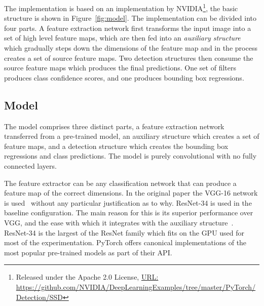 The implementation is based on an implementation by NVIDIA\footnote{Released under the Apache 2.0 License, \href{https://github.com/NVIDIA/DeepLearningExamples/tree/master/PyTorch/Detection/SSD}{URL:\\ } \url{https://github.com/NVIDIA/DeepLearningExamples/tree/master/PyTorch/Detection/SSD}}, the basic structure is shown in Figure~\ref{fig:model}.
The implementation can be divided into four parts.
A feature extraction network first transforms the input image into a set of high level feature maps, which are then fed into an \textit{auxiliary structure} which gradually steps down the dimensions of the feature map and in the process creates a set of source feature maps.
Two detection structures then consume the source feature maps which produces the final predictions.
One set of filters produces class confidence scores, and one produces bounding box regressions.

\subsection{Model}
The model comprises three distinct parts, a feature extraction network transferred from a pre-trained model, an auxiliary structure which creates a set of feature maps, and a detection structure which creates the bounding box regressions and class predictions.
The model is purely convolutional with no fully connected layers.

The feature extractor can be any classification network that can produce a feature map of the correct dimensions.
In the original paper the VGG-16 network is used\ \parencite{simonyan2015deep} without any particular justification as to why.
ResNet-34 is used in the baseline configuration.
The main reason for this is its superior performance over VGG, and the ease with which it integrates with the auxiliary structure\ \parencite{he2015deep}.
ResNet-34 is the largest of the ResNet family which fits on the GPU used for most of the experimentation.
PyTorch offers canonical implementations of the most popular pre-trained models as part of their API\@.

